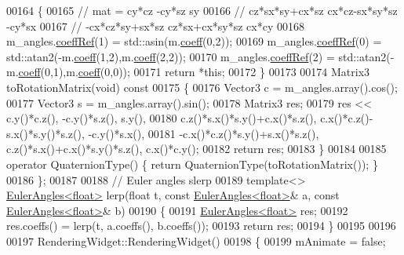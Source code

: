 \begin{DoxyCode}
00164   \{
00165     \textcolor{comment}{// mat =  cy*cz          -cy*sz           sy}
00166     \textcolor{comment}{//        cz*sx*sy+cx*sz  cx*cz-sx*sy*sz -cy*sx}
00167     \textcolor{comment}{//       -cx*cz*sy+sx*sz  cz*sx+cx*sy*sz  cx*cy}
00168     m\_angles.\hyperlink{class_eigen_1_1_plain_object_base_a25626a55b26a4323565f79d1b7c48ea8}{coeffRef}(1) = std::asin(m.\hyperlink{class_eigen_1_1_plain_object_base_afbfc12954f16d21aedb7bd839f64a278}{coeff}(0,2));
00169     m\_angles.\hyperlink{class_eigen_1_1_plain_object_base_a25626a55b26a4323565f79d1b7c48ea8}{coeffRef}(0) = std::atan2(-m.\hyperlink{class_eigen_1_1_plain_object_base_afbfc12954f16d21aedb7bd839f64a278}{coeff}(1,2),m.\hyperlink{class_eigen_1_1_plain_object_base_afbfc12954f16d21aedb7bd839f64a278}{coeff}(2,2));
00170     m\_angles.\hyperlink{class_eigen_1_1_plain_object_base_a25626a55b26a4323565f79d1b7c48ea8}{coeffRef}(2) = std::atan2(-m.\hyperlink{class_eigen_1_1_plain_object_base_afbfc12954f16d21aedb7bd839f64a278}{coeff}(0,1),m.\hyperlink{class_eigen_1_1_plain_object_base_afbfc12954f16d21aedb7bd839f64a278}{coeff}(0,0));
00171     \textcolor{keywordflow}{return} *\textcolor{keyword}{this};
00172   \}
00173 
00174   Matrix3 toRotationMatrix(\textcolor{keywordtype}{void})\textcolor{keyword}{ const}
00175 \textcolor{keyword}{  }\{
00176     Vector3 c = m\_angles.array().cos();
00177     Vector3 s = m\_angles.array().sin();
00178     Matrix3 res;
00179     res <<  c.y()*c.z(),                    -c.y()*s.z(),                   s.y(),
00180             c.z()*s.x()*s.y()+c.x()*s.z(),  c.x()*c.z()-s.x()*s.y()*s.z(),  -c.y()*s.x(),
00181             -c.x()*c.z()*s.y()+s.x()*s.z(), c.z()*s.x()+c.x()*s.y()*s.z(),  c.x()*c.y();
00182     \textcolor{keywordflow}{return} res;
00183   \}
00184 
00185   \textcolor{keyword}{operator} QuaternionType() \{ \textcolor{keywordflow}{return} QuaternionType(toRotationMatrix()); \}
00186 \};
00187 
00188 \textcolor{comment}{// Euler angles slerp}
00189 \textcolor{keyword}{template}<> \hyperlink{class_eigen_1_1_euler_angles}{EulerAngles<float>} lerp(\textcolor{keywordtype}{float} t, \textcolor{keyword}{const} 
      \hyperlink{class_eigen_1_1_euler_angles}{EulerAngles<float>}& a, \textcolor{keyword}{const} \hyperlink{class_eigen_1_1_euler_angles}{EulerAngles<float>}& b)
00190 \{
00191   \hyperlink{class_eigen_1_1_euler_angles}{EulerAngles<float>} res;
00192   res.coeffs() = lerp(t, a.coeffs(), b.coeffs());
00193   \textcolor{keywordflow}{return} res;
00194 \}
00195 
00196 
00197 RenderingWidget::RenderingWidget()
00198 \{
00199   mAnimate = \textcolor{keyword}{false};

\end{DoxyCode}
